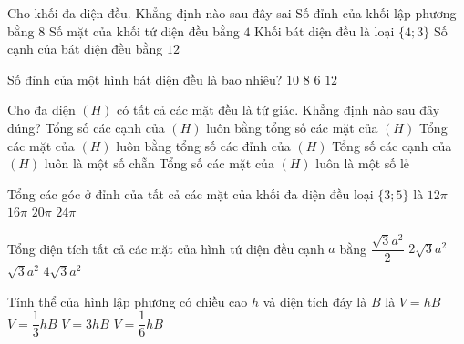 \begin{ex}%
	Cho khối đa diện đều. Khẳng định nào sau đây sai
	\choice
	{Số đỉnh của khối lập phương bằng $8$}
	{Số mặt của khối tứ diện đều bằng $4$}
	{\True Khối bát diện đều là loại $\{4;3\}$}
	{Số cạnh của bát diện đều bằng $12$}
\end{ex}
\begin{ex}%
	Số đỉnh của một hình bát diện đều là bao nhiêu?
	\choice
	{$10$}
	{$8$}
	{\True $6$}
	{$12$}
\end{ex}
\begin{ex}%
	Cho đa diện $(H)$ có tất cả các mặt đều là tứ giác. Khẳng định nào sau đây đúng?
	\choice
	{Tổng số các cạnh của $(H)$ luôn bằng tổng số các mặt của $(H)$}
	{Tổng các mặt của $(H)$ luôn bằng tổng số các đỉnh của $(H)$}
	{\True Tổng số các cạnh của $(H)$ luôn là một số chẵn}
	{Tổng số các mặt của $(H)$ luôn là một số lẻ}
\end{ex}
\begin{ex}%
	Tổng các góc ở đỉnh của tất cả các mặt của khối đa diện đều loại $\{3;5\}$ là
	\choice
	{$12\pi$}
	{$16\pi$}
	{\True $20\pi$}
	{$24\pi$}
\end{ex}
\begin{ex}%
	Tổng diện tích tất cả các mặt của hình tứ diện đều cạnh $a$ bằng
	\choice
	{$\dfrac{\sqrt{3}a^2}{2}$}
	{$2\sqrt{3}a^2$}
	{\True $\sqrt{3}a^2$}
	{$4\sqrt{3}a^2$}
\end{ex}
\begin{ex}%
	Tính thể của hình lập phương có chiều cao $h$ và diện tích đáy là $B$ là
	\choice
	{\True $V=hB$}
	{$V=\dfrac{1}{3}hB$}
	{$V=3hB$}
	{$V=\dfrac{1}{6}hB$}
\end{ex}

